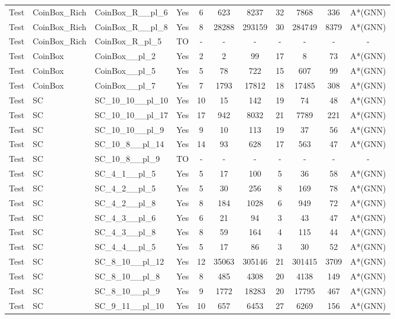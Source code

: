 \documentclass{article}
\begin{document}
\begin{tabular}{lllcccccccc}
Test & CoinBox\_Rich & CoinBox\_R\_\_pl\_6 & Yes & 6 & 623 & 8237 & 32 & 7868 & 336 & A*(GNN) \\
Test & CoinBox\_Rich & CoinBox\_R\_\_pl\_8 & Yes & 8 & 28288 & 293159 & 30 & 284749 & 8379 & A*(GNN) \\
Test & CoinBox\_Rich & CoinBox\_R\_pl\_5 & TO & - & - & - & - & - & - & - \\
Test & CoinBox & CoinBox\_\_pl\_2 & Yes & 2 & 2 & 99 & 17 & 8 & 73 & A*(GNN) \\
Test & CoinBox & CoinBox\_\_pl\_5 & Yes & 5 & 78 & 722 & 15 & 607 & 99 & A*(GNN) \\
Test & CoinBox & CoinBox\_\_pl\_7 & Yes & 7 & 1793 & 17812 & 18 & 17485 & 308 & A*(GNN) \\
Test & SC & SC\_10\_10\_\_pl\_10 & Yes & 10 & 15 & 142 & 19 & 74 & 48 & A*(GNN) \\
Test & SC & SC\_10\_10\_\_pl\_17 & Yes & 17 & 942 & 8032 & 21 & 7789 & 221 & A*(GNN) \\
Test & SC & SC\_10\_10\_\_pl\_9 & Yes & 9 & 10 & 113 & 19 & 37 & 56 & A*(GNN) \\
Test & SC & SC\_10\_8\_\_pl\_14 & Yes & 14 & 93 & 628 & 17 & 563 & 47 & A*(GNN) \\
Test & SC & SC\_10\_8\_\_pl\_9 & TO & - & - & - & - & - & - & - \\
Test & SC & SC\_4\_1\_\_pl\_5 & Yes & 5 & 17 & 100 & 5 & 36 & 58 & A*(GNN) \\
Test & SC & SC\_4\_2\_\_pl\_5 & Yes & 5 & 30 & 256 & 8 & 169 & 78 & A*(GNN) \\
Test & SC & SC\_4\_2\_\_pl\_8 & Yes & 8 & 184 & 1028 & 6 & 949 & 72 & A*(GNN) \\
Test & SC & SC\_4\_3\_\_pl\_6 & Yes & 6 & 21 & 94 & 3 & 43 & 47 & A*(GNN) \\
Test & SC & SC\_4\_3\_\_pl\_8 & Yes & 8 & 59 & 164 & 4 & 115 & 44 & A*(GNN) \\
Test & SC & SC\_4\_4\_\_pl\_5 & Yes & 5 & 17 & 86 & 3 & 30 & 52 & A*(GNN) \\
Test & SC & SC\_8\_10\_\_pl\_12 & Yes & 12 & 35063 & 305146 & 21 & 301415 & 3709 & A*(GNN) \\
Test & SC & SC\_8\_10\_\_pl\_8 & Yes & 8 & 485 & 4308 & 20 & 4138 & 149 & A*(GNN) \\
Test & SC & SC\_8\_10\_\_pl\_9 & Yes & 9 & 1772 & 18283 & 20 & 17795 & 467 & A*(GNN) \\
Test & SC & SC\_9\_11\_\_pl\_10 & Yes & 10 & 657 & 6453 & 27 & 6269 & 156 & A*(GNN) \\

\end{tabular}
\end{document}
